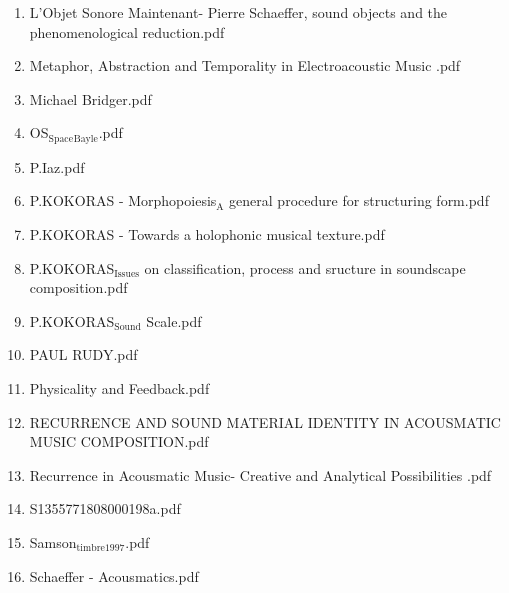 \documentclass[11pt]{article}
\begin{document}
\begin{enumerate}
\begin{enumerate}
\item L’Objet Sonore Maintenant- Pierre Schaeffer,  sound objects and the phenomenological  reduction.pdf
\label{sec-1-1-1-1-11-19-29-1-33}

\item Metaphor, Abstraction and Temporality in Electroacoustic Music .pdf
\label{sec-1-1-1-1-11-19-29-1-34}

\item Michael Bridger.pdf
\label{sec-1-1-1-1-11-19-29-1-35}

\item OS$_{\text{Space}}$$_{\text{Bayle}}$.pdf
\label{sec-1-1-1-1-11-19-29-1-36}

\item P.Iaz.pdf
\label{sec-1-1-1-1-11-19-29-1-37}

\item P.KOKORAS - Morphopoiesis$_{\text{A}}$ general procedure for structuring form.pdf
\label{sec-1-1-1-1-11-19-29-1-38}

\item P.KOKORAS - Towards a holophonic musical texture.pdf
\label{sec-1-1-1-1-11-19-29-1-39}

\item P.KOKORAS$_{\text{Issues}}$ on classification, process and sructure in soundscape composition.pdf
\label{sec-1-1-1-1-11-19-29-1-40}

\item P.KOKORAS$_{\text{Sound}}$ Scale.pdf
\label{sec-1-1-1-1-11-19-29-1-41}

\item PAUL RUDY.pdf
\label{sec-1-1-1-1-11-19-29-1-42}

\item Physicality and Feedback.pdf
\label{sec-1-1-1-1-11-19-29-1-43}

\item RECURRENCE AND SOUND MATERIAL IDENTITY IN  ACOUSMATIC MUSIC COMPOSITION.pdf
\label{sec-1-1-1-1-11-19-29-1-44}

\item Recurrence in Acousmatic Music- Creative and Analytical Possibilities  .pdf
\label{sec-1-1-1-1-11-19-29-1-45}

\item S1355771808000198a.pdf
\label{sec-1-1-1-1-11-19-29-1-46}

\item Samson$_{\text{timbre1997}}$.pdf
\label{sec-1-1-1-1-11-19-29-1-47}

\item Schaeffer - Acousmatics.pdf
\label{sec-1-1-1-1-11-19-29-1-48}


\end{enumerate}
\end{enumerate}
\end{document}
